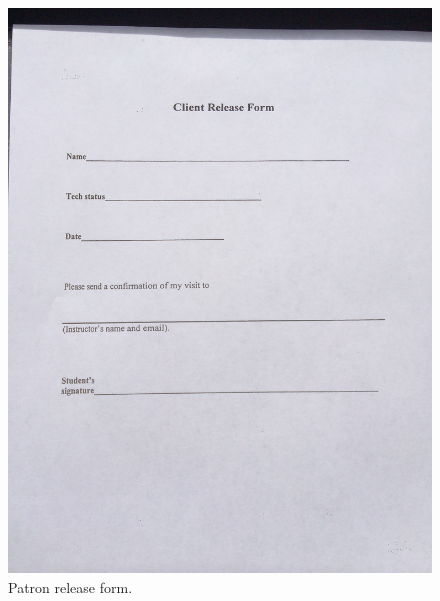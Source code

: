 \documentclass[12pt]{article} %
\begin{document}
\begin{figure}[H]
\centering
\includegraphics[width=0.5\linewidth]{"client release form"}
\caption{Patron release form.}
\label{fig:PatronReleaseForm}
\end{figure}
\end{document}
